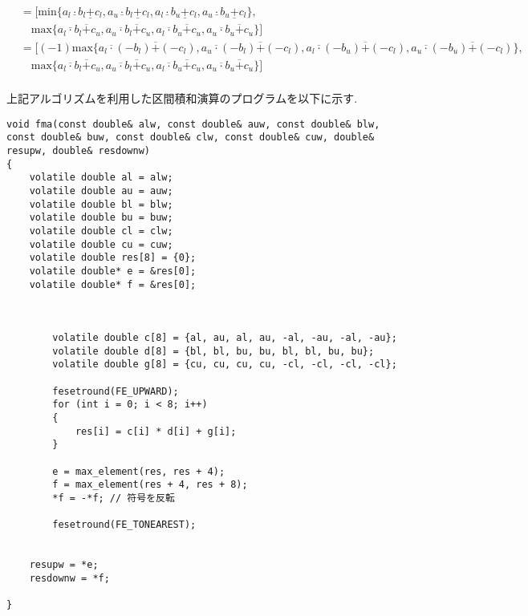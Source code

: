\documentclass[11pt,a4paper]{jsreport}
\theoremstyle{definition}
\begin{document}
\begin{align*}
&= [\text{min}\{a_l \underline{\cdot} b_l \underline{+} c_l,a_u \underline{\cdot} b_l \underline{+} c_l,a_l \underline{\cdot} b_u \underline{+} c_l,a_u \underline{\cdot} b_u \underline{+} c_l\}, \\
& \quad  \text{max}\{a_l \overline{\cdot} b_l \overline{+} c_u,a_u \overline{\cdot} b_l \overline{+} c_u,a_l \overline{\cdot} b_u \overline{+} c_u,a_u \overline{\cdot} b_u \overline{+} c_u\}] \\
&= [(-1)\text{max}\{a_l \overline{\cdot} (-b_l) \overline{+} (-c_l),a_u \overline{\cdot} (-b_l) \overline{+} (-c_l),a_l \overline{\cdot} (-b_u) \overline{+} (-c_l),a_u \overline{\cdot} (-b_u) \overline{+} (-c_l)\}, \\
& \quad  \text{max}\{a_l \overline{\cdot} b_l \overline{+} c_u,a_u \overline{\cdot} b_l \overline{+} c_u,a_l \overline{\cdot} b_u \overline{+} c_u,a_u \overline{\cdot} b_u \overline{+} c_u\}] \\
\end{align*}

	上記アルゴリズムを利用した区間積和演算のプログラムを以下に示す.

\begin{lstlisting}[caption = 区間FMAを利用した区間積和演算のプログラム]
void fma(const double& alw, const double& auw, const double& blw, const double& buw, const double& clw, const double& cuw, double& resupw, double& resdownw)
{
    volatile double al = alw;
    volatile double au = auw;
    volatile double bl = blw;
    volatile double bu = buw;
    volatile double cl = clw;
    volatile double cu = cuw;
    volatile double res[8] = {0};
    volatile double* e = &res[0];
    volatile double* f = &res[0];
   


        volatile double c[8] = {al, au, al, au, -al, -au, -al, -au};
        volatile double d[8] = {bl, bl, bu, bu, bl, bl, bu, bu};
        volatile double g[8] = {cu, cu, cu, cu, -cl, -cl, -cl, -cl};

        fesetround(FE_UPWARD);
        for (int i = 0; i < 8; i++)
        {
            res[i] = c[i] * d[i] + g[i];
        }

        e = max_element(res, res + 4);
        f = max_element(res + 4, res + 8);
        *f = -*f; // 符号を反転

        fesetround(FE_TONEAREST);


    resupw = *e;
    resdownw = *f;

}
\end{lstlisting}
\end{document}
